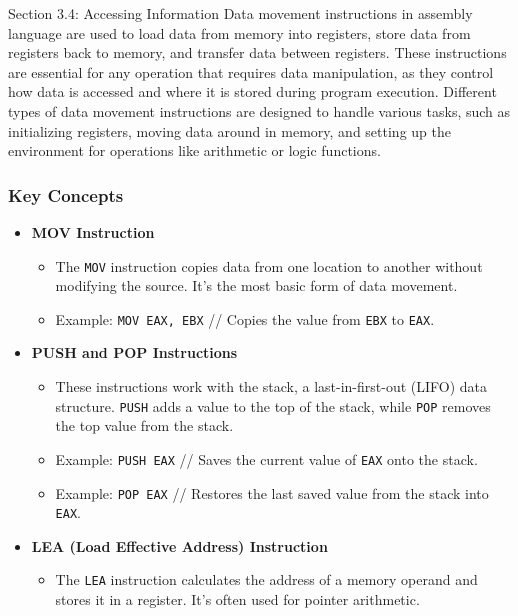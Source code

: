 \begin{notes}{Section 3.4: Accessing Information}
    Data movement instructions in assembly language are used to load data from memory into registers, store data from registers back to memory, and transfer data between registers. These instructions 
    are essential for any operation that requires data manipulation, as they control how data is accessed and where it is stored during program execution. Different types of data movement instructions 
    are designed to handle various tasks, such as initializing registers, moving data around in memory, and setting up the environment for operations like arithmetic or logic functions.

    \subsubsection*{Key Concepts}

    \begin{itemize}
        \item \textbf{MOV Instruction}
        \begin{itemize}
            \item The \texttt{MOV} instruction copies data from one location to another without modifying the source. It's the most basic form of data movement.
            \item Example: \texttt{MOV EAX, EBX} // Copies the value from \texttt{EBX} to \texttt{EAX}.
        \end{itemize}
        \item \textbf{PUSH and POP Instructions}
        \begin{itemize}
            \item These instructions work with the stack, a last-in-first-out (LIFO) data structure. \texttt{PUSH} adds a value to the top of the stack, while \texttt{POP} removes the top value from 
            the stack.
            \item Example: \texttt{PUSH EAX} // Saves the current value of \texttt{EAX} onto the stack.
            \item Example: \texttt{POP EAX} // Restores the last saved value from the stack into \texttt{EAX}.
        \end{itemize}
        \item \textbf{LEA (Load Effective Address) Instruction}
        \begin{itemize}
            \item The \texttt{LEA} instruction calculates the address of a memory operand and stores it in a register. It's often used for pointer arithmetic.

\end{itemize}
\end{itemize}
\end{notes}
